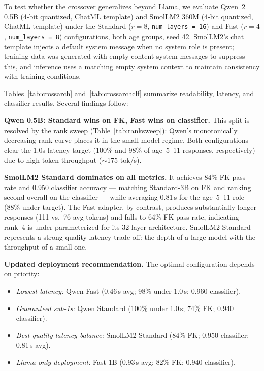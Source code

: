 \documentclass[journal]{IEEEtai}
\begin{document}
To test whether the crossover generalizes beyond Llama, we evaluate Qwen~2 0.5B (4-bit quantized, ChatML template) and SmolLM2 360M \cite{allal2025smollm2} (4-bit quantized, ChatML template) under the Standard ($r=8$, \texttt{num\_layers~=~16}) and Fast ($r=4$, \texttt{num\_layers~=~8}) configurations, both age groups, seed 42. SmolLM2's chat template injects a default system message when no system role is present; training data was generated with empty-content system messages to suppress this, and inference uses a matching empty system context to maintain consistency with training conditions.

Tables~\ref{tab:crossarch} and~\ref{tab:crossarchclf} summarize readability, latency, and classifier results. Several findings follow:

\textbf{Qwen 0.5B: Standard wins on FK, Fast wins on classifier.} This split is resolved by the rank sweep (Table~\ref{tab:ranksweep}): Qwen's monotonically decreasing rank curve places it in the small-model regime. Both configurations clear the 1.0s latency target (100\% and 98\% of age~5--11 responses, respectively) due to high token throughput ($\sim$175 tok/s).

\textbf{SmolLM2 Standard dominates on all metrics.} It achieves 84\% FK pass rate and 0.950 classifier accuracy --- matching Standard-3B on FK and ranking second overall on the classifier --- while averaging 0.81\,s for the age~5--11 role (88\% under target). The Fast adapter, by contrast, produces substantially longer responses (111 vs.\ 76 avg tokens) and falls to 64\% FK pass rate, indicating rank~4 is under-parameterized for its 32-layer architecture. SmolLM2 Standard represents a strong quality-latency trade-off: the depth of a large model with the throughput of a small one.

\textbf{Updated deployment recommendation.} The optimal configuration depends on priority:
\begin{itemize}
    \item \textit{Lowest latency:} Qwen Fast (0.46\,s avg; 98\% under 1.0\,s; 0.960 classifier).
    \item \textit{Guaranteed sub-1s:} Qwen Standard (100\% under 1.0\,s; 74\% FK; 0.940 classifier).
    \item \textit{Best quality-latency balance:} SmolLM2 Standard (84\% FK; 0.950 classifier; 0.81\,s avg).
    \item \textit{Llama-only deployment:} Fast-1B (0.93\,s avg; 82\% FK; 0.940 classifier).
\end{itemize}
\end{document}
